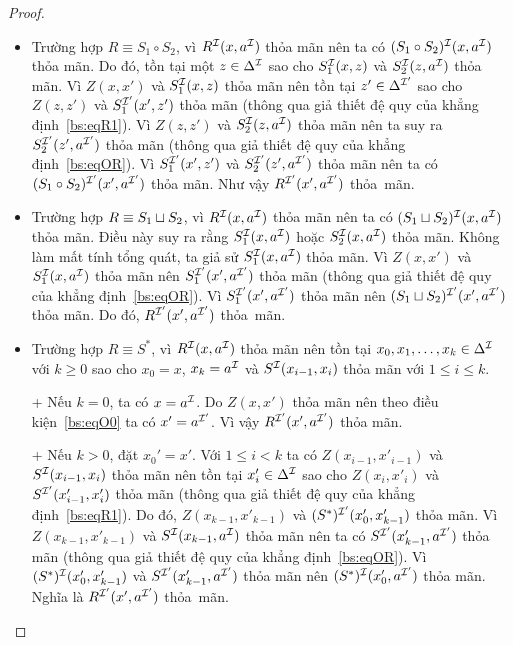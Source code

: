 \begin{proof}
\begin{itemize}
		\item Trường hợp $R \equiv S_1 \circ S_2$, vì $R^{\mathcal{I}}(x, a^{\mathcal{I}})$ thỏa mãn nên ta có $(S_1 \circ S_2)^{\mathcal{I}}(x,a^{\mathcal{I}})$ thỏa mãn. Do đó, tồn tại một $z \in \Delta^{\mathcal{I}}$ sao cho $S_1^{\mathcal{I}}(x,z)$ và $S_2^{\mathcal{I}}(z,a^{\mathcal{I}})$ thỏa mãn. Vì $Z(x,x')$ và $S_1^{\mathcal{I}}(x,z)$ thỏa mãn nên tồn tại $z' \in \Delta^{\mathcal{I}'}$ sao cho $Z(z,z')$ và $S_1^{\mathcal{I}'}(x',z')$ thỏa mãn (thông qua giả thiết đệ quy của khẳng định~\eqref{bs:eqR1}). Vì $Z(z,z')$ và $S_2^{\mathcal{I}}(z,a^{\mathcal{I}})$ thỏa mãn nên ta suy ra $S_2^{\mathcal{I}'}(z',a^{\mathcal{I}'})$ thỏa mãn (thông qua giả thiết đệ quy của khẳng định~\eqref{bs:eqOR}). Vì $S_1^{\mathcal{I}'}(x',z')$ và $S_2^{\mathcal{I}'}(z',a^{\mathcal{I}'})$ thỏa mãn nên ta có $(S_1 \circ S_2)^{\mathcal{I}'}(x',a^{\mathcal{I}'})$ thỏa mãn. Như vậy $R^{\mathcal{I}'}(x',a^{\mathcal{I}'})$ thỏa~mãn.
		
		\item Trường hợp $R \equiv S_1 \sqcup S_2$, vì $R^{\mathcal{I}}(x, a^{\mathcal{I}})$ thỏa mãn nên ta có $(S_1 \sqcup S_2)^{\mathcal{I}}(x,a^{\mathcal{I}})$ thỏa mãn. Điều này suy ra rằng $S_1^{\mathcal{I}}(x,a^{\mathcal{I}})$ hoặc $S_2^{\mathcal{I}}(x,a^{\mathcal{I}})$ thỏa mãn. Không làm mất tính tổng quát, ta giả sử $S_1^{\mathcal{I}}(x,a^{\mathcal{I}})$ thỏa mãn. Vì $Z(x,x')$ và $S_1^{\mathcal{I}}(x,a^{\mathcal{I}})$ thỏa mãn nên $S_1^{\mathcal{I}'}(x',a^{\mathcal{I}'})$ thỏa mãn (thông qua giả thiết đệ quy của khẳng định~\eqref{bs:eqOR}). Vì $S_1^{\mathcal{I}'}(x',a^{\mathcal{I}'})$ thỏa mãn nên $(S_1 \sqcup S_2)^{\mathcal{I}'}(x',a^{\mathcal{I}'})$ thỏa mãn. Do đó, $R^{\mathcal{I}'}(x',a^{\mathcal{I}'})$ thỏa~mãn.
		
		\item Trường hợp $R \equiv S^*$, vì $R^{\mathcal{I}}(x,a^{\mathcal{I}})$ thỏa mãn nên tồn tại $x_0, x_1, \ldots, x_k \in \Delta^{\mathcal{I}}$ với $k \geq 0$ sao cho $x_0 = x$, $x_k = a^{\mathcal{I}}$ và $S^{\mathcal{I}}(x_{i-1}, x_i)$ thỏa mãn với $1 \leq i \leq k$. 
		
		+ Nếu $k=0$, ta có $x=a^{\mathcal{I}}$. Do $Z(x,x')$ thỏa mãn nên theo điều kiện~\eqref{bs:eqO0} ta có $x' = a^{\mathcal{I}'}$. Vì vậy $R^{\mathcal{I}'}(x',a^{\mathcal{I}'})$ thỏa mãn.
		
		+ Nếu $k > 0$, đặt $x_0' = x'$. Với $1 \leq i < k$ ta có $Z(x_{i-1}, x'_{i-1})$ và $S^{\mathcal{I}}(x_{i-1}, x_i)$ thỏa mãn nên tồn tại $x'_i \in \Delta^{\mathcal{I}}$ sao cho $Z(x_i, x'_i)$ và $S^{\mathcal{I}'}(x'_{i-1}, x'_i)$ thỏa mãn (thông qua giả thiết đệ quy của khẳng định~\eqref{bs:eqR1}). Do đó, $Z(x_{k-1},x'_{k-1})$ và $(S^*)^{\mathcal{I}'}(x'_0, x'_{k-1})$ thỏa mãn. Vì $Z(x_{k-1},x'_{k-1})$ và $S^{\mathcal{I}}(x_{k-1},a^{\mathcal{I}})$ thỏa mãn nên ta có $S^{\mathcal{I}'}(x'_{k-1},a^{\mathcal{I}'})$ thỏa mãn (thông qua giả thiết đệ quy của khẳng định~\eqref{bs:eqOR}). Vì $(S^*)^{\mathcal{I}}(x'_0, x'_{k-1})$ và $S^{\mathcal{I}'}(x'_{k-1},a^{\mathcal{I}'})$ thỏa mãn nên $(S^*)^{\mathcal{I}}(x'_0, a^{\mathcal{I}'})$ thỏa mãn. Nghĩa là $R^{\mathcal{I}'}(x', a^{\mathcal{I}'})$ thỏa~mãn.
		

\end{itemize}
\end{proof}

